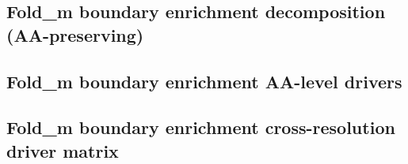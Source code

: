 \noindent

\noindent

\subsection{Fold\_m boundary enrichment decomposition (AA-preserving)}

\noindent

\noindent

\subsection{Fold\_m boundary enrichment AA-level drivers}

\noindent

\noindent

\noindent

\noindent

\subsection{Fold\_m boundary enrichment cross-resolution driver matrix}

\begin{sloppypar}
\noindent
\end{sloppypar}

\noindent
